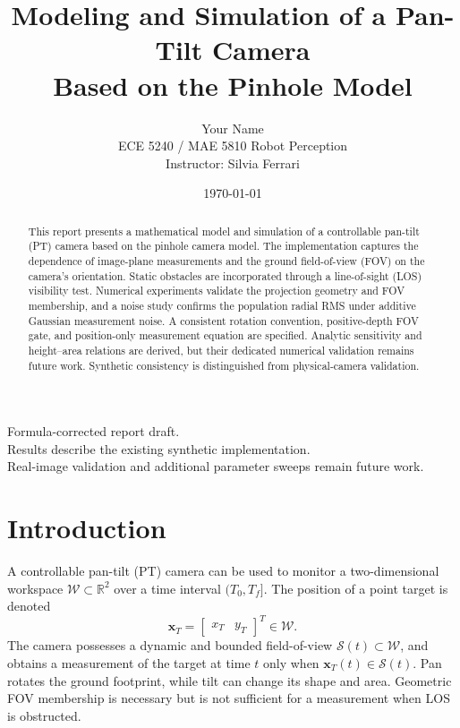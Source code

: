 \documentclass[11pt,letterpaper]{article}
\title{Modeling and Simulation of a Pan-Tilt Camera\\
Based on the Pinhole Model}
\author{Your Name\\
ECE 5240 / MAE 5810 Robot Perception\\
Instructor: Silvia Ferrari}
\date{\today}
\begin{document}
\begin{titlepage}
\maketitle
\thispagestyle{empty}
\vfill
\begin{center}
Formula-corrected report draft.\\
Results describe the existing synthetic implementation.\\
Real-image validation and additional parameter sweeps remain future work.
\end{center}
\vfill
\end{titlepage}

\begin{abstract}
This report presents a mathematical model and simulation of a controllable pan-tilt (PT) camera based on the pinhole camera model. The implementation captures the dependence of image-plane measurements and the ground field-of-view (FOV) on the camera's orientation. Static obstacles are incorporated through a line-of-sight (LOS) visibility test. Numerical experiments validate the projection geometry and FOV membership, and a noise study confirms the population radial RMS under additive Gaussian measurement noise. A consistent rotation convention, positive-depth FOV gate, and position-only measurement equation are specified. Analytic sensitivity and height--area relations are derived, but their dedicated numerical validation remains future work. Synthetic consistency is distinguished from physical-camera validation.
\end{abstract}

\section{Introduction}
A controllable pan-tilt (PT) camera can be used to monitor a two-dimensional workspace $\mathcal{W} \subset \mathbb{R}^2$ over a time interval $(T_0,T_f]$. The position of a point target is denoted
\begin{equation}
\mathbf{x}_T = \begin{bmatrix} x_T & y_T \end{bmatrix}^T \in \mathcal{W}.
\label{eq:xT}
\end{equation}
The camera possesses a dynamic and bounded field-of-view $\mathcal{S}(t) \subset \mathcal{W}$, and obtains a measurement of the target at time $t$ only when $\mathbf{x}_T(t) \in \mathcal{S}(t)$. Pan rotates the ground footprint, while tilt can change its shape and area. Geometric FOV membership is necessary but is not sufficient for a measurement when LOS is obstructed.
\end{document}
